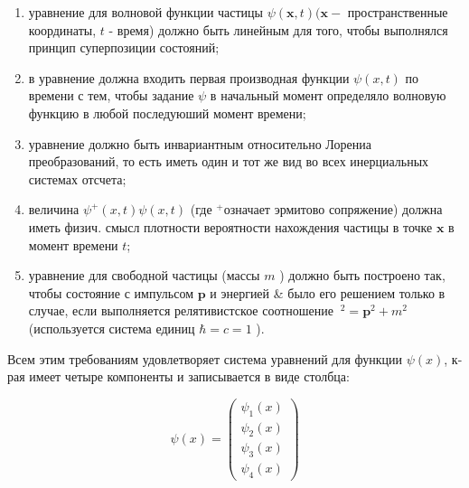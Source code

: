 \documentclass[10pt]{article}
\begin{document}
\begin{enumerate}

  \item уравнение для волновой функции частицы $\psi(\boldsymbol{x}, t)(\boldsymbol{x}-$ пространственные координаты, $t$ - время) должно быть линейным для того, чтобы выполнялся принцип суперпозиции состояний;



  \item в уравнение должна входить первая производная функции $\psi(x, t)$ по времени с тем, чтобы задание $\psi$ в начальный момент определяло волновую функцию в любой последуюший момент времени;



  \item уравнение должно быть инвариантным относительно Лорениа преобразований, то есть иметь один и тот же вид во всех инерциальных системах отсчета;



  \item величина $\psi^{+}(x, t) \psi(x, t)$ (где ${ }^{+}$означает эрмитово сопряжение) должна иметь физич. смысл плотности вероятности нахождения частицы в точке $\boldsymbol{x}$ в момент времени $t$;



  \item уравнение для свободной частицы (массы $m$ ) должно быть построено так, чтобы состояние с импульсом $\boldsymbol{p}$ и энергией \& было его решением только в случае, если выполняется релятивистское соотношение $\mathscr{~}^{2}=\boldsymbol{p}^{2}+m^{2}$ (используется система единиц $\hbar=c=1$ ).



\end{enumerate}



Всем этим требованиям удовлетворяет система уравнений для функции $\psi(x)$, к-рая имеет четыре компоненты и записывается в виде столбца:



\[

\psi(x)=\left(\begin{array}{l}

\psi_{1}(x) \\

\psi_{2}(x) \\

\psi_{3}(x) \\

\psi_{4}(x)

\end{array}\right)

\]
\end{document}
